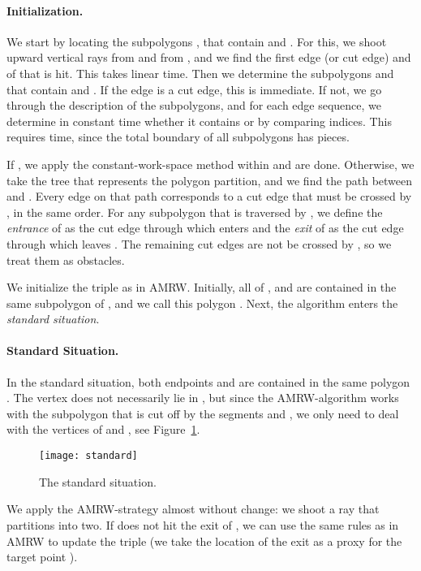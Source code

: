 \documentclass[11pt,a4paper]{article}
\begin{document}
\paragraph{Initialization.}
We start by locating the subpolygons
,  that contain  and . For this, we shoot upward
vertical rays from  and from , and we find the first edge (or cut edge)
 and  of  that is hit. This takes linear time.
Then we determine the subpolygons
 and  that contain  and . If the edge is a cut edge, this
is immediate. If not, we go through the description of the subpolygons, and
for each edge sequence, we determine in
constant time whether it contains  or  by comparing indices.
This requires  time, since the total boundary of all  subpolygons
has  pieces.



If , we
apply the constant-work-space method within  and are done. Otherwise,
we take the tree that represents the polygon partition, and we find the path
between  and . Every edge on that path
corresponds to a cut edge that must be crossed by ,
in the same order. For any subpolygon  that is traversed by ,
we define the \emph{entrance} of  as the cut edge
through which  enters  and the \emph{exit} of  as
the cut edge through which  leaves .
The remaining cut edges
are not be crossed by , so
we treat them as obstacles.

We initialize the triple  as in AMRW.
Initially, all of ,  and  are contained in the same subpolygon
of , and we call this polygon .
Next, the algorithm enters the \emph{standard situation}.




\paragraph{Standard Situation.}
In the standard situation, both endpoints  and  are contained
in the same polygon . The vertex  does not necessarily lie
in , but since the AMRW-algorithm works with the subpolygon
 that is cut off by the segments  and , we only need to
deal with the vertices of  and , see Figure~\ref{fig:standard}.

\begin{figure}[htb]
 \centerline{\texttt{[image: standard]}}
\caption{The standard situation.}
 \label{fig:standard}
\end{figure}


We apply the AMRW-strategy almost without change:
we shoot a ray  that partitions 
into two. If  does not hit the exit of , we can use the same
rules as in AMRW to update the triple  (we take the location of the
exit as a proxy for the target point ).
\end{document}
